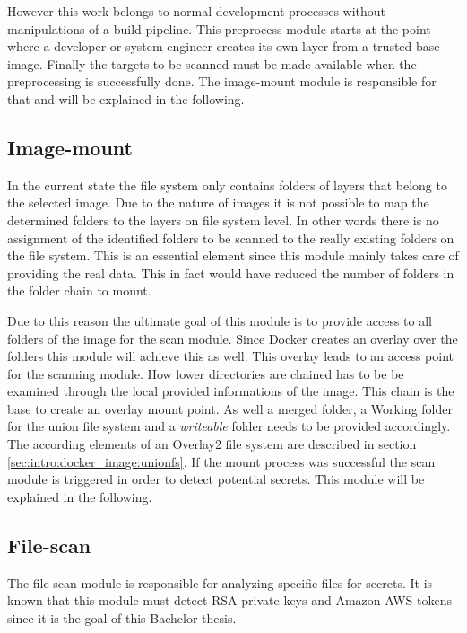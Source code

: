 However this work belongs to normal development processes without manipulations of a build pipeline.
This preprocess module starts at the point where a developer or system engineer creates its own layer from a trusted base image.
Finally the targets to be scanned must be made available when the preprocessing is successfully done. 
The image-mount module is responsible for that and will be explained in the following.

\subsection{Image-mount}
\label{ch:theory:analyzing_process:imgmount}
In the current state the file system only contains folders of layers that belong to the selected image.
Due to the nature of images it is not possible to map the determined folders to the layers on file system level. 
In other words there is no assignment of the identified folders to be scanned to the really existing folders on the file system.
This is an essential element since this module mainly takes care of providing the real data. 
This in fact would have reduced the number of folders in the folder chain to mount. 

Due to this reason the ultimate goal of this module is to provide access to all folders of the image for the scan module. 
Since Docker creates an overlay over the folders this module will achieve this as well. 
This overlay leads to an access point for the scanning module. 
How lower directories are chained has to be be examined through the local provided informations of the image.
This chain is the base to create an overlay mount point.
As well a merged folder, a Working folder for the union file system and a \textit{writeable} folder needs to be provided accordingly.
The according elements of an Overlay2 file system are described in section \ref{sec:intro:docker_image:unionfs}.
If the mount process was successful the scan module is triggered in order to detect potential secrets. 
This module will be explained in the following.

\subsection{File-scan}
\label{ch:theory:analyzing_process:scan}
The file scan module is responsible for analyzing specific files for secrets. 
It is known that this module must detect RSA private keys and Amazon AWS tokens since it is the goal of this Bachelor thesis.

